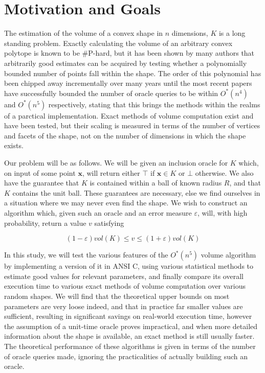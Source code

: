 \section{Motivation and Goals}

The estimation of the volume of a convex shape in $n$ dimensions, $K$ is a long standing problem. Exactly calculating the volume of an arbitrary convex polytope is known to be \#P-hard, %
 but it has been shown by many authors %
that arbitrarily good estimates can be acquired by testing whether a polynomially bounded number of points fall within the shape. The order of this polynomial has been chipped away incrementally over many years until the most recent papers %
have successfully bounded the number of oracle queries to be within $O^{*}(n^4)$ and $O^{*}(n^5)$ respectively, stating that this brings the methods within the realms of a parctical implementation. Exact methods of volume computation exist and have been tested, but their scaling is measured in terms of the number of vertices and facets of the shape, not on the number of dimensions in which the shape exists. 

Our problem will be as follows. We will be given an inclusion oracle for $K$ which, on input of some point $\bm{x}$, will return either $\top$ if $\bm{x} \in K$ or $\bot$ otherwise. We also have the guarantee that $K$ is contained within a ball of known radius $R$, and that $K$ contains the unit ball. These guarantees are necessary, else we find ourselves in a situation where we may never even find the shape. We wish to construct an algorithm which, given such an oracle and an error measure $\varepsilon$, will, with high probability, return a value $v$ satisfying

$$
(1-\varepsilon)vol(K) \leqslant v \leqslant (1+\varepsilon)vol(K)
$$

In this study, we will test the various features of the $O^{*}(n^5)$ volume algorithm by implementing a version of it in ANSI C, using various statistical methods to estimate good values for relevant parameters, and finally compare its overall execution time to various exact methods of volume computation over various random shapes. We will find that the theoretical upper bounds on most parameters are very loose indeed, and that in practice far smaller values are sufficient, resulting in significant savings on real-world execution time, however the assumption of a unit-time oracle proves impractical, and when more detailed information about the shape is available, an exact method is still usually faster. The theoretical performance of these algorithms is given in terms of the number of oracle queries made, ignoring the practicalities of actually building such an oracle.

